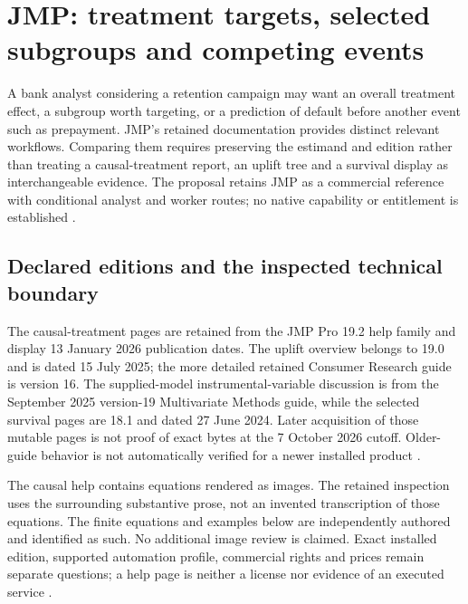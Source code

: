 \section{JMP: treatment targets, selected subgroups and competing events}
\label{sec:exec24-jmp-reuse}

A bank analyst considering a retention campaign may want an overall
treatment effect, a subgroup worth targeting, or a prediction of default
before another event such as prepayment. JMP's retained documentation
provides distinct relevant workflows. Comparing them requires preserving
the estimand and edition rather than treating a causal-treatment report,
an uplift tree and a survival display as interchangeable evidence. The
proposal retains JMP as a commercial reference with conditional analyst
and worker routes; no native capability or entitlement is established
\citep{exec13_ch_jmp_causal,exec13_ch_jmp_uplift,exec14_survival_jmp,
exec24_jmp_choice}.

\subsection{Declared editions and the inspected technical boundary}
The causal-treatment pages are retained from the JMP Pro 19.2 help family
and display 13 January 2026 publication dates. The uplift overview belongs
to 19.0 and is dated 15 July 2025; the more detailed retained Consumer
Research guide is version 16. The supplied-model instrumental-variable
discussion is from the September 2025 version-19 Multivariate Methods
guide, while the selected survival pages are 18.1 and dated 27 June 2024.
Later acquisition of those mutable pages is not proof of exact bytes at
the 7 October 2026 cutoff. Older-guide behavior is not automatically
verified for a newer installed product
\citep{exec13_ch_jmp_causal,exec13_ch_jmp_uplift,exec13_ivrd_jmp,
exec14_survival_jmp}.

The causal help contains equations rendered as images. The retained
inspection uses the surrounding substantive prose, not an invented
transcription of those equations. The finite equations and examples below
are independently authored and identified as such. No additional image
review is claimed. Exact installed edition, supported automation profile,
commercial rights and prices remain separate questions; a help page is
neither a license nor evidence of an executed service
\citep{exec24_jmp_choice}.

